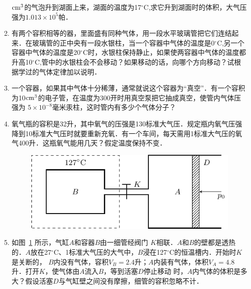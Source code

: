 \begin{enumerate}
${\rm cm^3}$的气泡升到湖面上来，湖面的温度为17$^\circ$C,求它升到湖面时的体积，大气压强为$1.013\times 10^5$帕．
\item  有两个容积相等的器，里面盛有同种气体，用一段水平玻璃管把它们连结起来．在玻璃管的正中央有一段水银柱，当一个容器中气体的温度是0$^\circ$C,另一个容器中气体的温度是20$^\circ$C时，水银柱保持静止，如果使两容器中气体的温度都升高10$^\circ$C,管中的水银柱会不会移动？如果移动的话，向哪个方向移动？试根据学过的气体定律加以说明．
\item  一个容器，如果其中气体十分稀薄，通常就说这个容器为“真空”．有一个容积为10${\rm cm^3}$的电子管，在温度为300开时用真空泵把它抽成真空，使管内气体压强为 $5\times 10^{-8}$毫米汞柱，这时管内有多少个气体分子？
\item  氧气瓶的容积是32升，其中氧气的压强是130标准大气压．规定瓶内氧气压强降到10标准大气压时就要重新充氧．有一个车间，每天需用1标准大气压的氧气400升．这瓶氧气能用几天？假定温度保持不变．
\begin{figure}[htbp]
    \centering
    \includegraphics{fig/B/3-16.pdf}
    \caption{}\label{fig_B_3-16}
\end{figure}


\item  如图~\ref{fig_B_3-16} 所示，气缸$A$和容器$B$由一细管经阀门
$K$相联．$A$和$B$的壁都是透热的．$A$放在27$^\circ$C、1标准大气压的大气中，$B$浸在127$^\circ$C的恒温槽内．开始时$K$是关断的，
$B$内没有气体，容积$V_B=2.4$升；$A$内装有气体，体积$V_A=
4.8$升．打开$K$，使气体由$A$流入$B$，等到活塞$D$停止移动
时，$A$内气体的体积是多大？假设活塞$D$与气缸壁之间没有摩擦，细管的容积忽略不计．
\end{enumerate}






